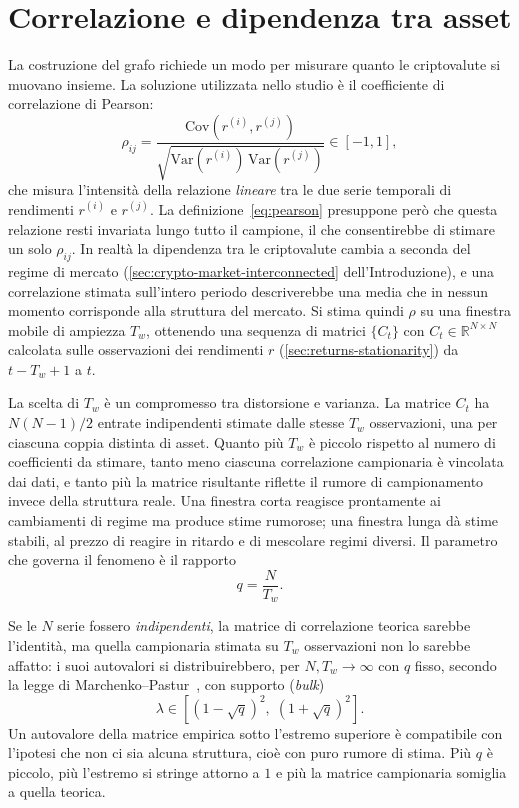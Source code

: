 \section{Correlazione e dipendenza tra asset}
\label{sec:correlation-dependence-pitfalls}

La costruzione del grafo richiede un modo per misurare quanto le criptovalute si muovano insieme. La soluzione utilizzata nello studio è il coefficiente di correlazione di Pearson:
\begin{equation}
\label{eq:pearson}
\rho_{ij} = \frac{\mathrm{Cov}(r^{(i)},r^{(j)})}{\sqrt{\mathrm{Var}(r^{(i)})\,\mathrm{Var}(r^{(j)})}} \in [-1,1],
\end{equation}
che misura l'intensità della relazione \emph{lineare} tra le due serie temporali di rendimenti $r^{(i)}$ e $r^{(j)}$. La definizione~\eqref{eq:pearson} presuppone però che questa relazione resti invariata lungo tutto il campione, il che consentirebbe di stimare un solo $\rho_{ij}$. In realtà la dipendenza tra le criptovalute cambia a seconda del regime di mercato (\cref{sec:crypto-market-interconnected} dell'Introduzione), e una correlazione stimata sull'intero periodo descriverebbe una media che in nessun momento corrisponde alla struttura del mercato. Si stima quindi $\rho$ su una finestra mobile di ampiezza $T_w$, ottenendo una sequenza di matrici $\{C_t\}$ con $C_t\in\mathbb{R}^{N\times N}$ calcolata sulle osservazioni dei rendimenti $r$ (\cref{sec:returns-stationarity}) da $t-T_w+1$ a $t$.

La scelta di $T_w$ è un compromesso tra distorsione e varianza. La matrice $C_t$ ha $N(N-1)/2$ entrate indipendenti stimate dalle stesse $T_w$ osservazioni, una per ciascuna coppia distinta di asset. Quanto più $T_w$ è piccolo rispetto al numero di coefficienti da stimare, tanto meno ciascuna correlazione campionaria è vincolata dai dati, e tanto più la matrice risultante riflette il rumore di campionamento invece della struttura reale. Una finestra corta reagisce prontamente ai cambiamenti di regime ma produce stime rumorose; una finestra lunga dà stime stabili, al prezzo di reagire in ritardo e di mescolare regimi diversi. Il parametro che governa il fenomeno è il rapporto
$$q = \frac{N}{T_w}.$$

Se le $N$ serie fossero \emph{indipendenti}, la matrice di correlazione teorica sarebbe l'identità, ma quella campionaria stimata su $T_w$ osservazioni non lo sarebbe affatto: i suoi autovalori si distribuirebbero, per $N,T_w\to\infty$ con $q$ fisso, secondo la legge di Marchenko--Pastur~\cite{marchenkopastur1967}, con supporto (\emph{bulk})
\begin{equation}
\label{eq:marchenko-pastur}
\lambda \in \left[(1-\sqrt q)^2,\;(1+\sqrt q)^2\right].
\end{equation}
Un autovalore della matrice empirica sotto l'estremo superiore è compatibile con l'ipotesi che non ci sia alcuna struttura, cioè con puro rumore di stima. Più $q$ è piccolo, più l'estremo si stringe attorno a $1$ e più la matrice campionaria somiglia a quella teorica.

